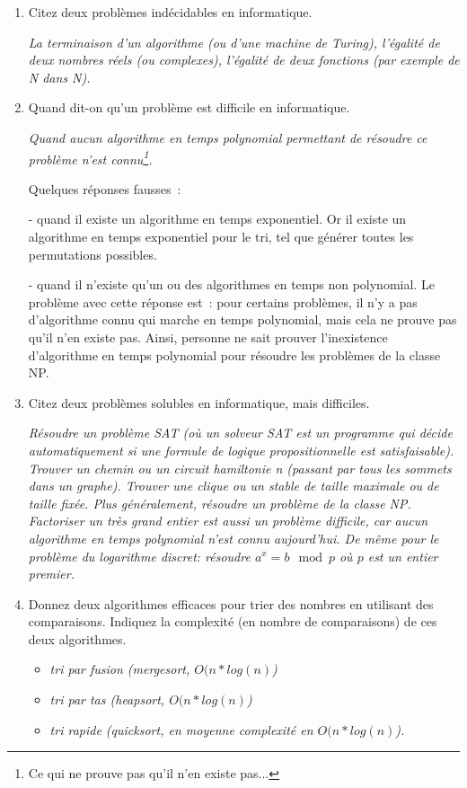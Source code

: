 \documentclass[11pt]{article}
\begin{document}
\begin{enumerate}
\item Citez deux problèmes indécidables en informatique.

\emph{La terminaison d’un algorithme (ou d’une machine de Turing), l’égalité de deux nombres réels (ou complexes), l’égalité de deux fonctions (par exemple de N dans N). }



\item  Quand dit-on qu'un problème est difficile en informatique.

{\it Quand aucun algorithme en temps polynomial permettant de résoudre ce problème n’est connu\footnote{Ce qui ne prouve pas qu'il n'en existe pas...}.

Quelques réponses fausses~: 

- quand il existe un algorithme en temps exponentiel. Or il existe un algorithme  en temps exponentiel pour le tri, tel que générer toutes les permutations possibles. 

- quand il n'existe qu'un ou des  algorithmes en temps non polynomial. Le problème avec cette réponse est~: pour certains problèmes, il n'y a pas d'algorithme
connu qui marche en temps polynomial, mais cela ne prouve pas qu'il n'en existe pas. Ainsi, personne ne sait prouver l'inexistence d'algorithme en temps polynomial pour résoudre les problèmes de la classe NP. 
}

\item  Citez deux problèmes solubles en informatique, mais difficiles.


\emph{Résoudre un problème SAT (où un solveur SAT est un programme qui décide automatiquement si une formule de logique
propositionnelle est satisfaisable). Trouver un chemin ou un circuit hamiltonie
n (passant par tous les sommets dans un graphe). Trouver une clique
ou un stable de taille maximale ou de taille fixée. Plus généralement, résoudre un problème de la classe NP. Factoriser un très grand entier est aussi un problème difficile, car aucun algorithme en temps polynomial n'est connu aujourd'hui. De même pour le problème du logarithme discret: résoudre $a^x=b \mod p$ où $p$ est un entier premier.}





\item Donnez deux algorithmes efficaces pour trier des nombres en utilisant
des comparaisons. Indiquez la complexité (en nombre de comparaisons)
de ces deux algorithmes. 
\begin{itemize}
\item  \emph{tri par fusion (mergesort, $O(n*log(n)$)}
\item  \emph{tri par tas (heapsort, $O(n*log(n)$)}
 \item  \emph{tri rapide (quicksort, en moyenne complexité en $O(n*log(n)$).}
\end{itemize}


\end{enumerate}
\end{document}
